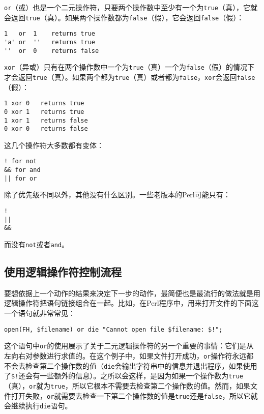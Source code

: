 \verb|or|（或）也是一个二元操作符，只要两个操作数中至少有一个为\verb|true|（真），它就会返回\verb|true|（真）。如果两个操作数都为\verb|false|（假），它会返回\verb|false|（假）：

\begin{lstlisting}
1   or  1    returns true
'a' or  ''   returns true
''  or  0    returns false
\end{lstlisting}

\verb|xor|（异或）只有在两个操作数中一个为\verb|true|（真）一个为\verb|false|（假）的情况下才会返回\verb|true|（真）。如果两个都为\verb|true|（真）或者都为\verb|false|，\verb|xor|会返回\verb|false|（假）：

\begin{lstlisting}
1 xor 0   returns true
0 xor 1   returns true
1 xor 1   returns false
0 xor 0   returns false
\end{lstlisting}

这几个操作符大多数都有变体：

\begin{lstlisting}
! for not
&& for and
|| for or
\end{lstlisting}

除了优先级不同以外，其他没有什么区别。一些老版本的Perl可能只有：

\begin{lstlisting}
!
||
&&
\end{lstlisting}

而没有\verb|not|或者\verb|and|。

\subsection{使用逻辑操作符控制流程}
要想依据上一个动作的结果来决定下一步的动作，最简便也是最流行的做法就是用逻辑操作符把语句链接组合在一起。比如，在Perl程序中，用来打开文件的下面这一个语句就非常常见：

\begin{lstlisting}
open(FH, $filename) or die "Cannot open file $filename: $!";
\end{lstlisting}

这个语句中\verb|or|的使用展示了关于二元逻辑操作符的另一个重要的事情：它们是从左向右对参数进行求值的。在这个例子中，如果文件打开成功，\verb|or|操作符永远都不会去检查第二个操作数的值（\verb|die|会输出字符串中的信息并退出程序，如果使用了\verb|$!|还会有一些额外的信息）。之所以会这样，是因为如果一个操作数为\verb|true|（真），\verb|or|就为\verb|true|，所以它根本不需要去检查第二个操作数的值。然而，如果文件打开失败，\verb|or|就需要去检查一下第二个操作数的值是\verb|true|还是\verb|false|，所以它就会继续执行\verb|die|语句。

